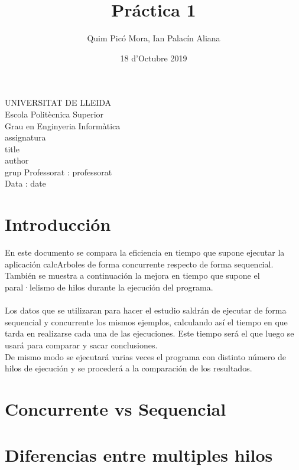 \documentclass{article}
\title{Práctica 1}
\author{Quim Picó Mora, Ian Palacín Aliana}
\date{18 d'Octubre 2019}
\renewcommand{\maketitle}{ %
	\begin{titlepage}
		\raggedright{UNIVERSITAT DE LLEIDA \\
			Escola Politècnica Superior \\
			Grau en Enginyeria Informàtica\\
			\1assignatura\\}
		\vspace{5cm}
		\centering\huge{\5title \\}
		\vspace{3cm}
		\large{\6author} \\
		\normalsize{\3grup}
		\vfill
		Professorat : \4professorat \\
		Data : \7date
\end{titlepage}}
\begin{document}
	\maketitle
	\thispagestyle{empty}
	
	\newpage
	\tableofcontents
	\newpage
	




\section{Introducción}

En este documento se compara la eficiencia en tiempo que supone ejecutar la aplicación calcArboles de forma concurrente respecto de forma sequencial. También se muestra a continuación la mejora en tiempo que supone el paral·lelismo de hilos durante la ejecución del programa.
\\\\
Los datos que se utilizaran para hacer el estudio saldrán de ejecutar de forma sequencial y concurrente los mismos ejemplos, calculando así el tiempo en que tarda en realizarse cada una de las ejecuciones. Este tiempo será el que luego se usará para comparar y sacar conclusiones.\\
De mismo modo se ejecutará varias veces el programa con distinto número de hilos de ejecución y se procederá a la comparación de los resultados.


\section{Concurrente vs Sequencial}

\section{Diferencias entre multiples hilos}
\end{document}
